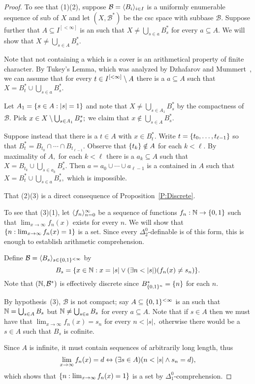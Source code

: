 \documentclass[csc]{subfiles}
\begin{document}
\begin{proof}
  To see that (1)\THEN(2), suppose \(\mathcal{B} = \langle B_i\rangle_{i \in I}\) is a uniformly enumerable sequence of sub of \(X\) and let \((X,\mathcal{B}^*)\) be the csc space with subbase \(\mathcal{B}.\)
  Suppose further that \(A \subseteq I^{[<\infty]}\) is an \eset{} such that \(X \neq \bigcup_{s \in a} B^*_s\) for every \fset{} \(a \subseteq A.\)
  We will show that \(X \neq \bigcup_{s \in A} B^*_s.\)

  Note that not containing a \fset{} which is a cover is an arithmetical property of finite character.
  By Tukey's Lemma, which was analyzed by Dzhafarov and Mummert~\cite{DzhafarovMummertXX}, we can assume that for every \(t \in I^{[<\infty]} \setminus A\) there is a \fset{} \(a \subseteq A\) such that \(X = B^*_t \cup \bigcup_{s \in a} B^*_s.\)
  
  Let \(A_1 = \lbrace s \in A : |s| = 1\rbrace\) and note that \(X \neq \bigcup_{s \in A_1} B^*_s\) by the compactness of \(\mathcal{B}.\)
  Pick \(x \in X \setminus \bigcup_{s \in A_1} B^*_s;\) we claim that \(x \notin \bigcup_{s \in A} B^*_s.\)
  
  Suppose instead that there is a \(t \in A\) with \(x \in B^*_t.\)
  Write \(t = \lbrace t_0,\dots,t_{\ell-1}\rbrace\) so that \(B^*_t = B_{t_0} \cap\cdots\cap B_{t_{\ell-1}}.\)
  Observe that \(\lbrace t_k\rbrace \notin A\) for each \(k < \ell.\)
  By maximality of \(A,\) for each \(k < \ell\) there is a \fset{} \(a_k \subseteq A\) such that \(X = B_{t_k} \cup \bigcup_{s \in a_k} B^*_s.\)
  Then \(a = a_0 \cup\cdots\cup a_{\ell-1}\) is a \fset{} contained in \(A\) such that \(X = B^*_t \cup \bigcup_{s \in a} B^*_s,\) which is impossible.

  That (2)\THEN(3) is a direct consequence of Proposition~\ref{P:Discrete}.

  To see that (3)\THEN(1), let \(\langle f_n\rangle_{n=0}^\infty\) be a sequence of functions \(f_n:\mathbb{N}\to\lbrace0,1\rbrace\) such that \(\lim_{x\to\infty} f_n(x)\) exists for every \(n.\)
  We will show that \(\lbrace n : \lim_{x\to\infty} f_n(x) = 1\rbrace\) is a set.
  Since every \(\Delta^0_2\)-definable \sset{} is of this form, this is enough to establish arithmetic comprehension.

  Define \(\mathcal{B} = \langle B_s\rangle_{s \in \lbrace0,1\rbrace^{<\infty}}\) by \[B_s = \lbrace x \in \mathbb{N} : x = |s| \lor (\exists n < |s|)(f_n(x) \neq s_n)\rbrace.\]
  Note that \((\mathbb{N},\mathcal{B}^*)\) is effectively discrete since \(B^*_{\lbrace0,1\rbrace^n} = \lbrace n\rbrace\) for each \(n.\)
  
  By hypothesis~(3), \(\mathcal{B}\) is not compact; say \(A \subseteq \lbrace0,1\rbrace^{<\infty}\) is an \eset{} such that \(\mathbb{N} = \bigcup_{s \in A} B_s\) but \(\mathbb{N} \neq \bigcup_{s \in a} B_s\) for every \fset{} \(a \subseteq A.\)
  Note that if \(s \in A\) then we must have that \(\lim_{x\to\infty} f_n(x) = s_n\) for every \(n < |s|,\) otherwise there would be a \(s \in A\) such that \(B_s\) is cofinite.

  Since \(A\) is infinite, it must contain sequences of arbitrarily long length, thus \[\lim_{x\to\infty} f_n(x) = d \leftrightarrow (\exists s \in A)(n < |s| \land s_n = d),\] which shows that \(\lbrace n : \lim_{x\to\infty} f_n(x) = 1\rbrace\) is a set by \(\Delta^0_1\)-comprehension.
\end{proof}
\end{document}
